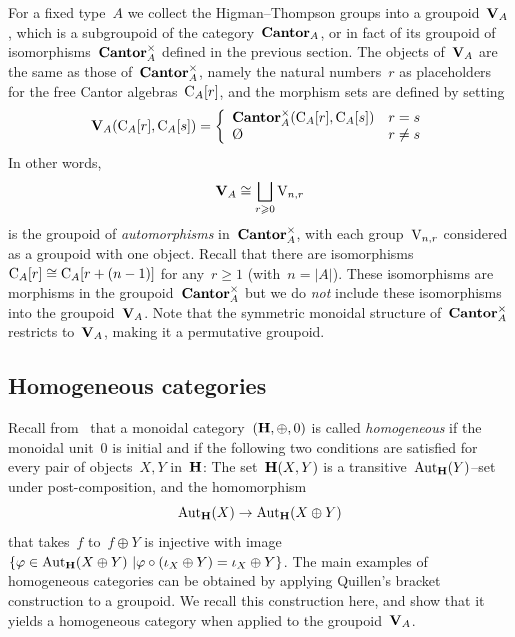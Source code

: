 For a fixed type~$A$ we collect the Higman--Thompson groups into a groupoid~$\mathbf{V}_A$, which is a subgroupoid of the category~$\mathbf{Cantor}_A$, or in fact of its groupoid of isomorphisms~$\mathbf{Cantor}_A^\times$ defined in the previous section.  The objects of~$\mathbf{V}_A$ are the same as those of~$\mathbf{Cantor}_A^\times$, namely the natural numbers~$r$ as placeholders for the free Cantor algebras~$\mathrm{C}_A[r]$, and the morphism sets are defined by setting 
\begin{align*}
\bfV_A(\rmC_A[r],\rmC_A[s])=\left\{ \begin{array}{ll}  \Can^\x_A(\rmC_A[r],\rmC_A[s]) & r=s\\
\emptyset & r\neq s
\end{array}\right.
\end{align*}
In other words,~$$\mathbf{V}_A\cong \bigsqcup_{r\geqslant 0}\mathrm{V}_{n,r}$$ is the groupoid of {\em automorphisms} in~$\mathbf{Cantor}_A^\times$, with each group~$\mathrm{V}_{n,r}$ considered as a groupoid with one object. Recall that there are isomorphisms~$\mathrm{C}_{A}[r]\cong\mathrm{C}_A[r+(n-1)]$ for any~$r\geqslant1$ (with~$n=|A|$). These isomorphisms are morphisms in the groupoid~$\mathbf{Cantor}^\times_A$  but we do {\em not} include these isomorphisms into the groupoid~$\mathbf{V}_A$. 
Note that the symmetric monoidal structure of~$\mathbf{Cantor}_A^\times$ restricts to~$\mathbf{V}_A$, making it a permutative groupoid. 

\subsection{Homogeneous categories}\label{sec:homogeneous}



Recall from~\cite[Def.~1.3]{Randal-Williams+Wahl} that a monoidal category~$(\mathbf{H},\oplus,0)$ is called {\em homogeneous} if the monoidal unit~$0$ is initial and if the following two conditions are satisfied for every pair of objects~$X, Y$ in~$\mathbf{H}$: The set~${\mathbf{H}}(X,Y)$ is a transitive~$\operatorname{Aut}_{\mathbf{H}}(Y)$--set under post-composition, and the homomorphism
\[
\operatorname{Aut}_{\mathbf{H}}(X)\to\operatorname{Aut}_{\mathbf{H}}(X\oplus Y)
\]
that takes~$f$ to~$f\oplus Y$ is injective with image~$\{\varphi\in\operatorname{Aut}_{\mathbf{H}}(X\oplus Y)\ |\varphi\circ (\iota_X\oplus Y)=\iota_X\oplus Y\}$. %
The main examples of homogeneous categories can be obtained by applying Quillen's bracket construction to a groupoid. We recall this construction here, and show that it yields a homogeneous category when applied to the groupoid~$\mathbf{V}_A$. 

